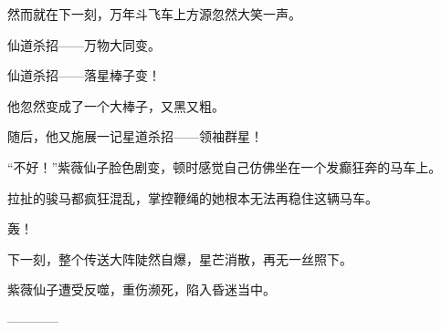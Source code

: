 \begin{this_body}
然而就在下一刻，万年斗飞车上方源忽然大笑一声。

仙道杀招——万物大同变。

仙道杀招——落星棒子变！

他忽然变成了一个大棒子，又黑又粗。

随后，他又施展一记星道杀招——领袖群星！

“不好！”紫薇仙子脸色剧变，顿时感觉自己仿佛坐在一个发癫狂奔的马车上。

拉扯的骏马都疯狂混乱，掌控鞭绳的她根本无法再稳住这辆马车。

轰！

下一刻，整个传送大阵陡然自爆，星芒消散，再无一丝照下。

紫薇仙子遭受反噬，重伤濒死，陷入昏迷当中。

------------

\end{this_body}


